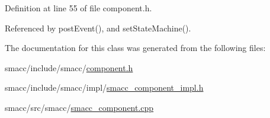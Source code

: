 Definition at line 55 of file component.\+h.



Referenced by post\+Event(), and set\+State\+Machine().



The documentation for this class was generated from the following files\+:\begin{DoxyCompactItemize}
\item 
smacc/include/smacc/\hyperlink{component_8h}{component.\+h}\item 
smacc/include/smacc/impl/\hyperlink{smacc__component__impl_8h}{smacc\+\_\+component\+\_\+impl.\+h}\item 
smacc/src/smacc/\hyperlink{smacc__component_8cpp}{smacc\+\_\+component.\+cpp}\end{DoxyCompactItemize}
